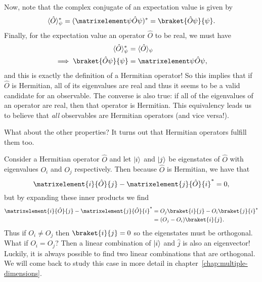 \documentclass[../quantum_mechanics.tex]{subfiles}
\begin{document}
            Now, note that the complex conjugate of an expectation value is given by
            \begin{equation}
                \langle\hat{O}\rangle_\psi^\ast=(\expval{\hat{O}}{\psi})^\ast=\braket{\hat{O}\psi}{\psi}.
            \end{equation}
            Finally, for the expectation value an operator $\hat{O}$ to be real, we must have
            \begin{align}
                \langle\hat{O}\rangle_\psi^\ast&=\langle\hat{O}\rangle_\psi\\
                \implies\braket{\hat{O}\psi}{\psi}&=\expval{\hat{O}}{\psi},
            \end{align}
            and this is exactly the definition of a Hermitian operator!
            So this implies that if $\hat{O}$ is Hermitian, all of its eigenvalues are real and thus it seems to be a valid candidate for an observable.
            The converse is also true: if all of the eigenvalues of an operator are real, then that operator is Hermitian.
            This equivalency leads us to believe that \textit{all} observables are Hermitian operators (and vice versa!).

            What about the other properties?
            It turns out that Hermitian operators fulfill them too.

            Consider a Hermitian operator $\hat{O}$ and let $\lvert i\rangle$ and $\lvert j\rangle$ be eigenstates of $\hat{O}$ with eigenvalues $O_i$ and $O_j$ respectively.
            Then because $\hat{O}$ is Hermitian, we have that
            \begin{equation}
                \matrixelement{i}{\hat{O}}{j}-\matrixelement{j}{\hat{O}}{i}^\ast=0,
            \end{equation}
            but by expanding these inner products we find
            \begin{align}
                \matrixelement{i}{\hat{O}}{j}-\matrixelement{j}{\hat{O}}{i}^\ast&=O_j\braket{i}{j}-O_i\braket{j}{i}^\ast\\
                &=(O_j-O_i)\braket{i}{j}.
            \end{align}
            Thus if $O_i\neq O_j$ then $\braket{i}{j}=0$ so the eigenstates must be orthogonal.
            What if $O_i=O_j$?
            Then a linear combination of $\lvert i\rangle$ and $\hat{j}$ is also an eigenvector!
            Luckily, it is always possible to find two linear combinations that are orthogonal.
            We will come back to study this case in more detail in chapter~\ref{chap:multiple-dimensions}.
\end{document}
